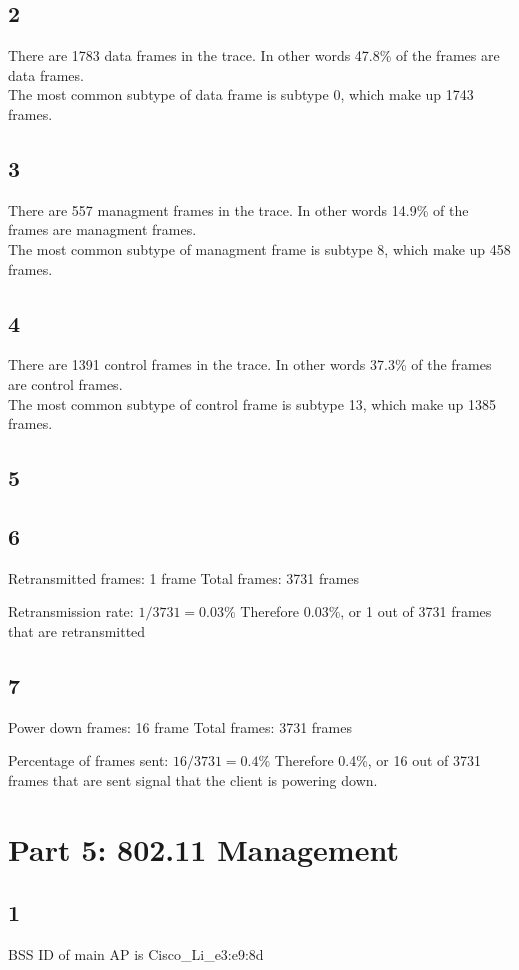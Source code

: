 \documentclass{article}
\begin{document}
    \subsection*{2}
    There are 1783 data frames in the trace. In other words 47.8\% of the frames are data frames.\\
    The most common subtype of data frame is subtype 0, which make up 1743 frames.
    \subsection*{3}
    There are 557 managment frames in the trace. In other words 14.9\% of the frames are managment frames.\\
    The most common subtype of managment frame is subtype 8, which make up 458 frames.
    \subsection*{4}
    There are 1391 control frames in the trace. In other words 37.3\% of the frames are control frames.\\
    The most common subtype of control frame is subtype 13, which make up 1385 frames.
    \subsection*{5}
    \subsection*{6}
    Retransmitted frames: 1 frame
    Total frames: 3731 frames

    Retransmission rate: $1 / 3731 = 0.03\%$
    Therefore 0.03\%, or 1 out of 3731 frames that are retransmitted
    \subsection*{7}
    Power down frames: 16 frame
    Total frames: 3731 frames

    Percentage of frames sent: $16 / 3731 = 0.4\%$
    Therefore 0.4\%, or 16 out of 3731 frames that are sent signal that the client is powering down.
    \section*{Part 5: 802.11 Management}
    \subsection*{1}
        BSS ID of main AP is Cisco_Li_e3:e9:8d
\end{document}
